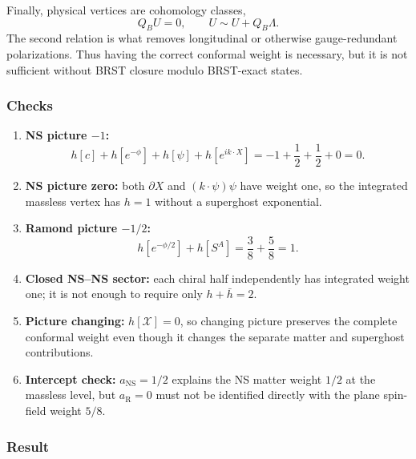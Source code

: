 \documentclass[
  10pt,
  a4paper,
  openany]{book}
\begin{document}
Finally, physical vertices are cohomology classes, \[
Q_B U=0,
\qquad
U\sim U+Q_B\Lambda.
\] The second relation is what removes longitudinal or otherwise
gauge-redundant polarizations. Thus having the correct conformal weight
is necessary, but it is not sufficient without BRST closure modulo
BRST-exact states.

\subsubsection{Checks}\label{checks-12}

\begin{enumerate}
\def\labelenumi{\arabic{enumi}.}
\item
  \textbf{NS picture \(-1\):} \[
  h[c]+h[e^{-\phi}]+h[\psi]+h[e^{ik\cdot X}]
  =-1+\frac12+\frac12+0=0.
  \]
\item
  \textbf{NS picture zero:} both \(\partial X\) and \((k\cdot\psi)\psi\)
  have weight one, so the integrated massless vertex has \(h=1\) without
  a superghost exponential.
\item
  \textbf{Ramond picture \(-1/2\):} \[
  h[e^{-\phi/2}]+h[S^A]
  =\frac38+\frac58=1.
  \]
\item
  \textbf{Closed NS--NS sector:} each chiral half independently has
  integrated weight one; it is not enough to require only
  \(h+\bar h=2\).
\item
  \textbf{Picture changing:} \(h[\mathcal X]=0\), so changing picture
  preserves the complete conformal weight even though it changes the
  separate matter and superghost contributions.
\item
  \textbf{Intercept check:} \(a_{\mathrm{NS}}=1/2\) explains the NS
  matter weight \(1/2\) at the massless level, but \(a_{\mathrm R}=0\)
  must not be identified directly with the plane spin-field weight
  \(5/8\).
\end{enumerate}

\subsubsection{Result}\label{result-16}
\end{document}
